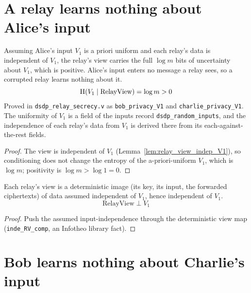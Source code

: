 \chapter{A relay learns nothing about Alice's input}

\begin{theorem}
  \label{thm:bob_privacy_V1}
  \rocqok
  Assuming Alice's input $V_1$ is a priori uniform and each relay's data is
  independent of $V_1$, the relay's view carries the full $\log m$ bits of
  uncertainty about $V_1$, which is positive. Alice's input enters no message a
  relay sees, so a corrupted relay learns nothing about it.
  \[ \mathrm{H}(V_1 \mid \mathrm{RelayView}) = \log m > 0 \]
  Proved in \texttt{dsdp\_relay\_secrecy.v} as \texttt{bob\_privacy\_V1}
  and \texttt{charlie\_privacy\_V1}. The uniformity of $V_1$ is a field of the
  inputs record \texttt{dsdp\_random\_inputs}, and the independence of each
  relay's data from $V_1$ is derived there from its each-against-the-rest
  fields.
\end{theorem}
\begin{proof}
  \rocqok
  The view is independent of $V_1$ (Lemma~\ref{lem:relay_view_indep_V1}), so
  conditioning does not change the entropy of the a-priori-uniform $V_1$, which is
  $\log m$; positivity is $\log m > \log 1 = 0$.
\end{proof}

\begin{lemma}
  \label{lem:relay_view_indep_V1}
  \rocqok
  Each relay's view is a deterministic image (its key, its input, the forwarded
  ciphertexts) of data assumed independent of $V_1$, hence independent of $V_1$.
  \[ \mathrm{RelayView} \perp V_1 \]
\end{lemma}
\begin{proof}
  \rocqok
  Push the assumed input-independence through the deterministic view map
  (\texttt{inde\_RV\_comp}, an Infotheo library fact).
\end{proof}

\chapter{Bob learns nothing about Charlie's input}

